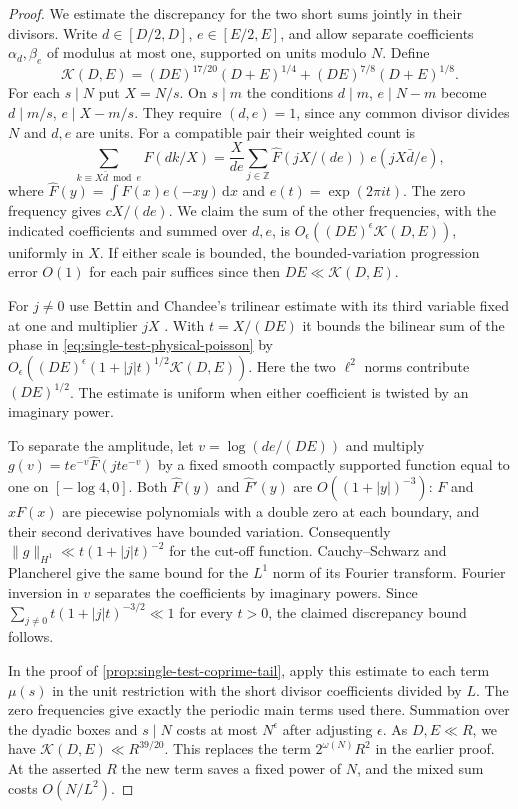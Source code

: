 \documentclass[11pt,a4paper]{article}
\numberwithin{equation}{section}
\newcommand{\ud}{\mathrm d}
\begin{document}
\begin{proof}
We estimate the discrepancy for the two short sums jointly in
their divisors. Write $d\in[D/2,D]$, $e\in[E/2,E]$, and allow
separate coefficients $\alpha_d,\beta_e$ of modulus at most one,
supported on units modulo $N$. Define
\[
 \mathcal K(D,E)=
 (DE)^{17/20}(D+E)^{1/4}+(DE)^{7/8}(D+E)^{1/8}.
\]
For each $s\mid N$ put $X=N/s$. On $s\mid m$ the conditions
$d\mid m$, $e\mid N-m$ become $d\mid m/s$, $e\mid X-m/s$.
They require $(d,e)=1$, since any common divisor divides $N$
and $d,e$ are units. For a compatible pair their weighted count is
\begin{equation}
 \sum_{k\equiv X\bar d\bmod e} F(dk/X)
   =\frac X{de}\sum_{j\in\mathbb Z}
        \widehat F(jX/(de))\,e(jX\bar d/e),
 \label{eq:single-test-physical-poisson}
\end{equation}
where $\widehat F(y)=\int F(x)e(-xy)\,\ud x$ and $e(t)=\exp(2\pi i t)$.
The zero frequency gives $cX/(de)$. We claim the sum of the
other frequencies, with the indicated coefficients and summed over
$d,e$, is $O_\epsilon((DE)^\epsilon\mathcal K(D,E))$, uniformly
in $X$. If either scale is bounded, the bounded-variation
progression error $O(1)$ for each pair suffices since then
$DE\ll\mathcal K(D,E)$.

For $j\ne0$ use Bettin and Chandee's trilinear estimate with its
third variable fixed at one and multiplier $jX$
\cite[Theorem~1]{BettinChandeeFractions}. With $t=X/(DE)$ it bounds
the bilinear sum of the phase in \cref{eq:single-test-physical-poisson}
by $O_\epsilon((DE)^\epsilon(1+|j|t)^{1/2}\mathcal K(D,E))$.
Here the two $\ell^2$ norms contribute $(DE)^{1/2}$. The estimate
is uniform when either coefficient is twisted by an imaginary power.

To separate the amplitude, let $v=\log(de/(DE))$ and multiply
$g(v)=t e^{-v}\widehat F(jt e^{-v})$ by a fixed smooth compactly
supported function equal to one on $[-\log4,0]$. Both
$\widehat F(y)$ and $\widehat F'(y)$ are $O((1+|y|)^{-3})$:
$F$ and $xF(x)$ are piecewise polynomials with a double zero at
each boundary, and their second derivatives have bounded variation.
Consequently $\|g\|_{H^1}\ll t(1+|j|t)^{-2}$ for the cut-off
function. Cauchy--Schwarz and Plancherel give the same bound for
the $L^1$ norm of its Fourier transform. Fourier inversion in $v$
separates the coefficients by imaginary powers. Since
$\sum_{j\ne0} t(1+|j|t)^{-3/2}\ll1$ for every $t>0$, the
claimed discrepancy bound follows.

In the proof of \cref{prop:single-test-coprime-tail}, apply this
estimate to each term $\mu(s)$ in the unit restriction with the
short divisor coefficients divided by $L$. The zero frequencies
give exactly the periodic main terms used there. Summation over
the dyadic boxes and $s\mid N$ costs at most $N^\epsilon$ after
adjusting $\epsilon$. As $D,E\ll R$, we have
$\mathcal K(D,E)\ll R^{39/20}$. This replaces the term
$2^{\omega(N)}R^2$ in the earlier proof. At the asserted $R$ the
new term saves a fixed power of $N$, and the mixed sum costs
$O(N/L^2)$.
\end{proof}
\end{document}
